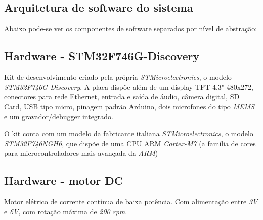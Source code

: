 \documentclass[times, twoside, watermark]{artigo}
\begin{document}
\subsection{Arquitetura de software do sistema}
Abaixo pode-se ver os componentes de software separados por nível de abstração:



\subsection{Hardware - STM32F746G-Discovery}
Kit de desenvolvimento criado pela própria \textit{STMicroelectronics}, o modelo \textit{STM32F746G-Discovery}.
A placa dispõe além de um display TFT 4.3" 480x272, conectores para rede Ethernet, entrada e saída de áudio, câmera digital, SD Card, USB tipo micro, pinagem padrão Arduino, dois microfones do tipo \textit{MEMS} e um gravador/debugger integrado.


O kit conta com um modelo da fabricante italiana \textit{STMicroelectronics}, o modelo \textit{STM32F746NGH6}, que dispõe de uma CPU ARM \textit{Cortex-M7} (a família de cores para microcontroladores mais avançada da \textit{ARM})


\subsection{Hardware - motor DC}
Motor elétrico de corrente contínua de baixa potência. Com alimentação entre \textit{3V} e \textit{6V}, com rotação máxima de \textit{200 rpm}.

\end{document}
